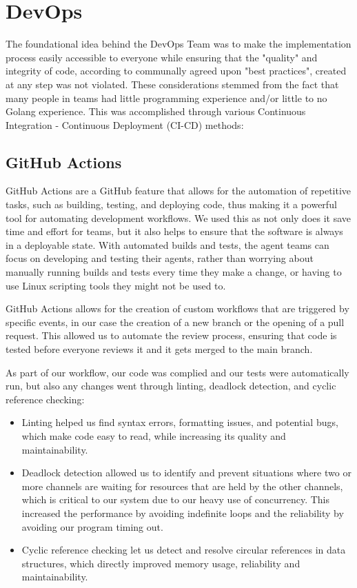 \newpage

\section{DevOps}

The foundational idea behind the DevOps Team was to make the implementation process easily accessible to everyone while ensuring that the "quality" and integrity of code, according to communally agreed upon "best practices", created at any step was not violated. These considerations stemmed from the fact that many people in teams had little programming experience and/or little to no Golang experience. This was accomplished through various Continuous Integration - Continuous Deployment (CI-CD) methods:

\subsection{GitHub Actions}

GitHub Actions are a GitHub feature that allows for the automation of repetitive tasks, such as building, testing, and deploying code, thus making it a powerful tool for automating development workflows. We used this as not only does it save time and effort for teams, but it also helps to ensure that the software is always in a deployable state. With automated builds and tests, the agent teams can focus on developing and testing their agents, rather than worrying about manually running builds and tests every time they make a change, or having to use Linux scripting tools they might not be used to.

GitHub Actions allows for the creation of custom workflows that are triggered by specific events, in our case  the creation of a new branch or the opening of a pull request. This allowed us to automate the review process, ensuring that code is tested before everyone reviews it and it gets merged to the main branch.

As part of our workflow, our code was complied and our tests were automatically run, but also any changes went through linting, deadlock detection, and cyclic reference checking:
\begin{itemize}
    \item Linting helped us find syntax errors, formatting issues, and potential bugs, which make code easy to read, while increasing its quality and maintainability.
    \item Deadlock detection allowed us to identify and prevent situations where two or more channels are waiting for resources that are held by the other channels, which is critical to our system due to our heavy use of concurrency. This increased the performance by avoiding indefinite loops and the reliability by avoiding our program timing out. 
    \item Cyclic reference checking let us detect and resolve circular references in data structures, which directly improved memory usage, reliability and maintainability. 
\end{itemize}


